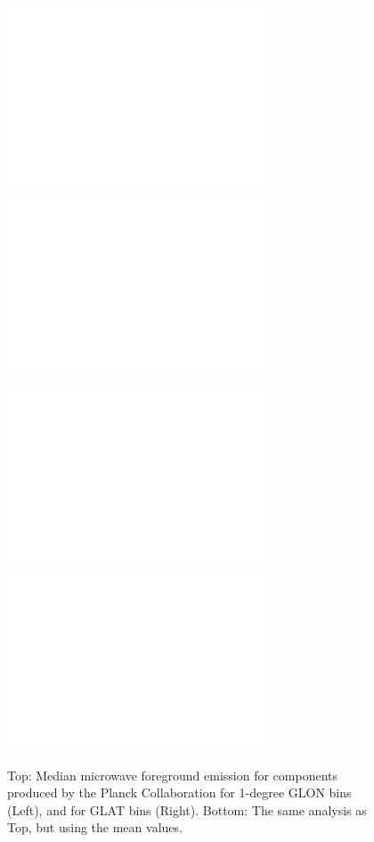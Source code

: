 \documentclass[preprint2,longabstract]{aastex}
\begin{document}
      \begin{figure}
        \label{fig:MWCompsbyGLOTandGLON}
        \includegraphics[width=80mm]{../Plots/CommanderByGLON_median.pdf}
        \includegraphics[width=80mm]{../Plots/CommanderByGLAT_median.pdf}
        \includegraphics[width=80mm]{../Plots/CommanderByGLON_mean.pdf}
        \includegraphics[width=80mm]{../Plots/CommanderByGLAT_mean.pdf}
        \centering
        \caption{Top: Median microwave foreground emission for components produced by the Planck Collaboration for 1-degree GLON bins (Left), and for GLAT bins (Right). Bottom: The same analysis as Top, but using the mean values. }
      \end{figure}
\end{document}
